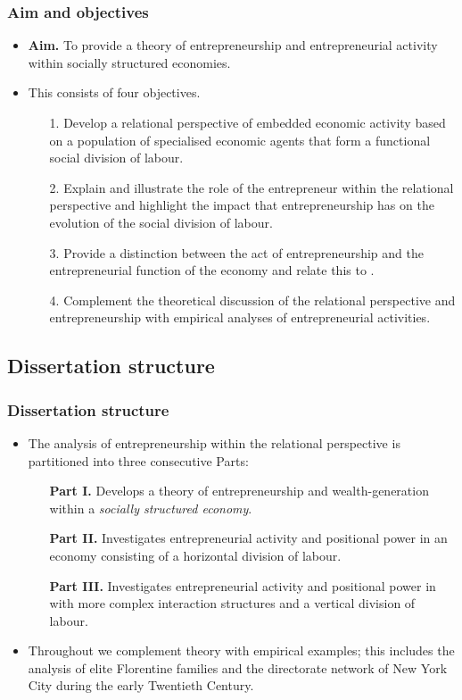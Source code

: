 \documentclass[9pt]{beamer}
\begin{document}
\begin{frame} \frametitle{Aim and objectives}
\begin{itemize}
\item \textbf{Aim.} To provide a theory of entrepreneurship and entrepreneurial activity within socially structured economies.
\medskip
\item This consists of four objectives.
\begin{itemize}
\medskip
\item[1.] Develop a relational perspective of embedded economic activity based on a population of specialised economic agents that form a functional social division of labour.
\medskip
\item[2.] Explain and illustrate the role of the entrepreneur within the relational perspective and highlight the impact that entrepreneurship has on the evolution of the social division of labour.
\medskip
\item[3.] Provide a distinction between the act of entrepreneurship and the entrepreneurial function of the economy and relate this to .
\medskip
\item[4.] Complement the theoretical discussion of the relational perspective and entrepreneurship with empirical analyses of entrepreneurial activities.
\end{itemize}
\end{itemize}
\end{frame}

\subsection{Dissertation structure}

\begin{frame} \frametitle{Dissertation structure}
\begin{itemize}
\item The analysis of entrepreneurship within the relational perspective is partitioned into three consecutive Parts:
\begin{itemize}
\medskip
\item[\textbf{Part I.}] Develops a theory of entrepreneurship and wealth-generation within a \emph{socially structured economy}.
\medskip
\item[\textbf{Part II.}] Investigates entrepreneurial activity and positional power in an economy consisting of a horizontal division of labour.
\medskip
\item[\textbf{Part III.}] Investigates entrepreneurial activity and positional power in with more complex interaction structures and a vertical division of labour.
\end{itemize}
\medskip
\item Throughout we complement theory with empirical examples; this includes the analysis of elite Florentine families and the directorate network of New York City during the early Twentieth Century.
\end{itemize}
\end{frame}
\end{document}
